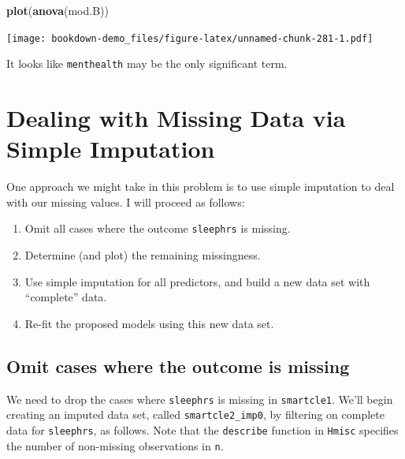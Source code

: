 \documentclass[]{book}
\newenvironment{Shaded}{\begin{snugshade}}{\end{snugshade}}
\newcommand{\KeywordTok}[1]{\textcolor[rgb]{0.13,0.29,0.53}{\textbf{#1}}}
\newcommand{\OperatorTok}[1]{\textcolor[rgb]{0.81,0.36,0.00}{\textbf{#1}}}
\newcommand{\NormalTok}[1]{#1}
\providecommand{\tightlist}{%
  \setlength{\itemsep}{0pt}\setlength{\parskip}{0pt}}
\theoremstyle{definition}
\theoremstyle{definition}
\theoremstyle{definition}
\theoremstyle{remark}
\begin{document}
\begin{Shaded}
\begin{Highlighting}[]
\KeywordTok{plot}\NormalTok{(}\KeywordTok{anova}\NormalTok{(mod.B))}
\end{Highlighting}
\end{Shaded}

\texttt{[image: bookdown-demo\_files/figure-latex/unnamed-chunk-281-1.pdf]}

It looks like \texttt{menthealth} may be the only significant term.

\section{Dealing with Missing Data via Simple
Imputation}\label{dealing-with-missing-data-via-simple-imputation-1}

One approach we might take in this problem is to use simple imputation
to deal with our missing values. I will proceed as follows:

\begin{enumerate}
\def\labelenumi{\arabic{enumi}.}
\tightlist
\item
  Omit all cases where the outcome \texttt{sleephrs} is missing.
\item
  Determine (and plot) the remaining missingness.
\item
  Use simple imputation for all predictors, and build a new data set
  with ``complete'' data.
\item
  Re-fit the proposed models using this new data set.
\end{enumerate}

\subsection{Omit cases where the outcome is
missing}\label{omit-cases-where-the-outcome-is-missing-1}

We need to drop the cases where \texttt{sleephrs} is missing in
\texttt{smartcle1}. We'll begin creating an imputed data set, called
\texttt{smartcle2\_imp0}, by filtering on complete data for
\texttt{sleephrs}, as follows. Note that the \texttt{describe} function
in \texttt{Hmisc} specifies the number of non-missing observations in
\texttt{n}.

\begin{Shaded}
\end{Shaded}
\end{document}

